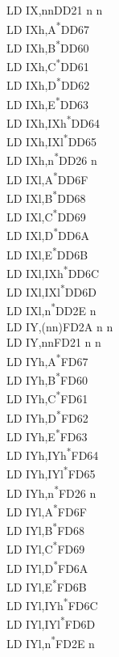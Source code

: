 \documentclass[oneside,a4paper]{book}
\begin{document}
\begin{multicols}{3}
{\begin{tabbing}
LD IX,nn\>DD21 n n\\
LD IXh,A\textsuperscript{*}\>DD67\\
LD IXh,B\textsuperscript{*}\>DD60\\
LD IXh,C\textsuperscript{*}\>DD61\\
LD IXh,D\textsuperscript{*}\>DD62\\
LD IXh,E\textsuperscript{*}\>DD63\\
LD IXh,IXh\textsuperscript{*}\>DD64\\
LD IXh,IXl\textsuperscript{*}\>DD65\\
LD IXh,n\textsuperscript{*}\>DD26 n \\
LD IXl,A\textsuperscript{*}\>DD6F\\
LD IXl,B\textsuperscript{*}\>DD68\\
LD IXl,C\textsuperscript{*}\>DD69\\
LD IXl,D\textsuperscript{*}\>DD6A\\
LD IXl,E\textsuperscript{*}\>DD6B\\
LD IXl,IXh\textsuperscript{*}\>DD6C\\
LD IXl,IXl\textsuperscript{*}\>DD6D\\
LD IXl,n\textsuperscript{*}\>DD2E n\\
LD IY,(nn)\>FD2A n n\\
LD IY,nn\>FD21 n n\\
LD IYh,A\textsuperscript{*}\>FD67\\
LD IYh,B\textsuperscript{*}\>FD60\\
LD IYh,C\textsuperscript{*}\>FD61\\
LD IYh,D\textsuperscript{*}\>FD62\\
LD IYh,E\textsuperscript{*}\>FD63\\
LD IYh,IYh\textsuperscript{*}\>FD64\\
LD IYh,IYl\textsuperscript{*}\>FD65\\
LD IYh,n\textsuperscript{*}\>FD26 n\\
LD IYl,A\textsuperscript{*}\>FD6F\\
LD IYl,B\textsuperscript{*}\>FD68\\
LD IYl,C\textsuperscript{*}\>FD69\\
LD IYl,D\textsuperscript{*}\>FD6A\\
LD IYl,E\textsuperscript{*}\>FD6B\\
LD IYl,IYh\textsuperscript{*}\>FD6C\\
LD IYl,IYl\textsuperscript{*}\>FD6D\\
LD IYl,n\textsuperscript{*}\>FD2E n\\

\end{tabbing}}
\end{multicols}
\end{document}
